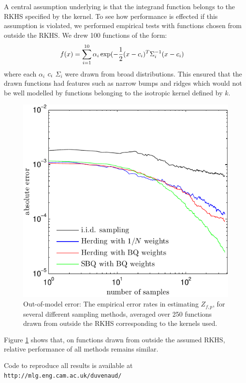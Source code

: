 \documentclass[]{article}
\begin{document}
A central assumption underlying \sbq{} is that the integrand function belongs to the RKHS specified by the kernel.  To see how performance is effected if this assumption is violated, we performed empirical tests with functions chosen from outside the RKHS.  We drew 100 functions of the form:
%
\begin{align}
f({x}) & = \sum_{i=1}^{10} \alpha_i \exp(-\frac{1}{2} ({x} -{c}_i)^T \Sigma_i^{-1} ({x} -{c}_i)
\end{align}
%
where each $\alpha_i$ ${c}_i$ $\Sigma_i$ were drawn from broad distributions.  This ensured that the drawn functions had features such as narrow bumps and ridges which would not be well modelled by functions belonging to the isotropic kernel defined by $k$.
%
\begin{figure}
\includegraphics[width=\columnwidth]{figures/error_curve_outmodel_400_v3}
\caption{Out-of-model error: The empirical error rates in estimating $Z_{f,p}$, for several different sampling methods, averaged over 250 functions drawn from outside the RKHS corresponding to the kernels used.}
\label{fig:error_curve_outmodel}
\end{figure}
%
Figure \ref{fig:error_curve_outmodel} shows that, on functions drawn from outside the assumed RKHS, relative performance of all methods remains similar.

Code to reproduce all results is available at \texttt{http://mlg.eng.cam.ac.uk/duvenaud/}
\end{document}
